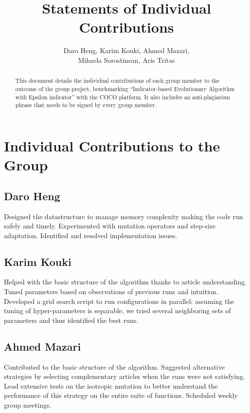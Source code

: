 \documentclass{article}
\begin{document}
\title{Statements of Individual Contributions}
\author{Daro Heng, Karim Kouki, Ahmed Mazari, \\ Mihaela Sorostinean, Aris Tritas}
\maketitle
\begin{abstract}
This document details the individual contributions of each group member to the outcome of the group project, benchmarking ``Indicator-based Evolutionary Algorithm with Epsilon indicator'' with the COCO platform. It also includes an anti-plagiarism phrase that needs to be signed by every group member.
\end{abstract}


\section*{Individual Contributions to the Group}

\subsection*{Daro Heng}
Designed the datastructure to manage memory complexity making the code run safely and timely. 
Experimented with mutation operators and step-size adaptation. Identified and resolved implementation issues.

\subsection*{Karim Kouki}
Helped with the basic structure of the algorithm thanks to article understanding. 
Tuned parameters based on observations of previous runs and intuition. 
Developed a grid search script to run configurations in parallel: assuming the tuning of hyper-parameters is separable, we tried several neighboring sets of parameters and thus identified the best runs.

\subsection*{Ahmed Mazari}
Contributed to the basic structure of the algorithm. 
Suggested alternative strategies by selecting complementary articles when the runs were not satisfying. 
Lead extensive tests on the isotropic mutation to better understand the performance of this strategy on the entire suite of functions. 
Scheduled weekly group meetings.
\end{document}
